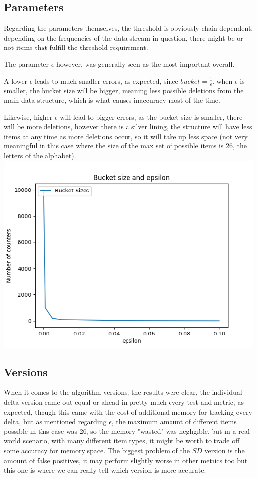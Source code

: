 \documentclass[...]{revdetua}
\begin{document}
\subsection{Parameters}
Regarding the parameters themselves, the threshold is obviously chain dependent, depending on the frequencies of the data stream in question, there might be or not items that fulfill the threshold requirement.\par
The parameter $\epsilon$ however, was generally seen as the most important overall.\par
A lower $\epsilon$ leads to much smaller errors, as expected, since $bucket=\frac{1}{\epsilon}$, when $\epsilon$ is smaller, the bucket size will be bigger, meaning less possible deletions from the main data structure, which is what causes inaccuracy most of the time.\par
Likewise, higher $\epsilon$ will lead to bigger errors, as the bucket size is smaller, there will be more deletions, however there is a silver lining, the structure will have less items at any time as more deletions occur, so it will take up less space (not very meaningful in this case where the size of the max set of possible items is 26, the letters of the alphabet).
\includegraphics[scale=0.5]{bucket size.png}



\subsection{Versions}
When it comes to the algorithm versions, the results were clear, the individual delta version came out equal or ahead in pretty much every test and metric, as expected, though this came with the cost of additional memory for tracking every delta, but as mentioned regarding $\epsilon$, the maximum amount of different items possible in this case was 26, so the memory "wasted" was negligible, but in a real world scenario, with many different item types, it might be worth to trade off some accuracy for memory space.
The biggest problem of the $SD$ version is the amount of false positives, it may perform slightly worse in other metrics too but this one is where we can really tell which version is more accurate.
\end{document}
